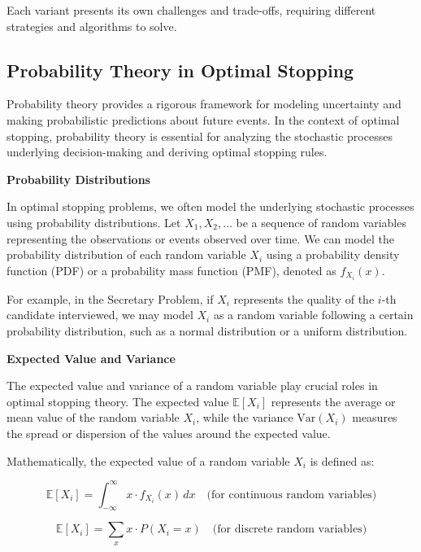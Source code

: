 \documentclass[12pt]{book} %
\begin{document}
Each variant presents its own challenges and trade-offs, requiring different strategies and algorithms to solve.

\subsection{Probability Theory in Optimal Stopping}

Probability theory provides a rigorous framework for modeling uncertainty and making probabilistic predictions about future events. In the context of optimal stopping, probability theory is essential for analyzing the stochastic processes underlying decision-making and deriving optimal stopping rules.

\textbf{Probability Distributions}

In optimal stopping problems, we often model the underlying stochastic processes using probability distributions. Let $X_1, X_2, \ldots$ be a sequence of random variables representing the observations or events observed over time. We can model the probability distribution of each random variable $X_i$ using a probability density function (PDF) or a probability mass function (PMF), denoted as $f_{X_i}(x)$.

For example, in the Secretary Problem, if $X_i$ represents the quality of the $i$-th candidate interviewed, we may model $X_i$ as a random variable following a certain probability distribution, such as a normal distribution or a uniform distribution.

\textbf{Expected Value and Variance}

The expected value and variance of a random variable play crucial roles in optimal stopping theory. The expected value $\mathbb{E}[X_i]$ represents the average or mean value of the random variable $X_i$, while the variance $\text{Var}(X_i)$ measures the spread or dispersion of the values around the expected value.

Mathematically, the expected value of a random variable $X_i$ is defined as:

\begin{equation*}
    \mathbb{E}[X_i] = \int_{-\infty}^{\infty} x \cdot f_{X_i}(x) \, dx \quad \text{(for continuous random variables)}
\end{equation*}

\begin{equation*}
    \mathbb{E}[X_i] = \sum_{x} x \cdot P(X_i = x) \quad \text{(for discrete random variables)}
\end{equation*}
\end{document}
